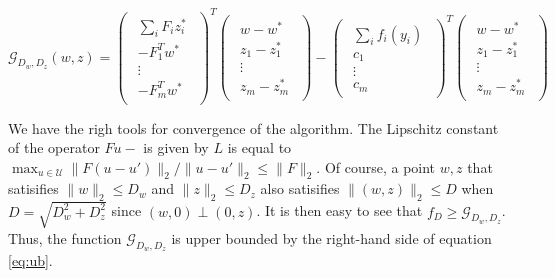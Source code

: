 \begin{equation*}
    \mathcal{G}_{D_{ w},D_{ z}}( w,  z)
    =
    \begin{pmatrix}
      \begin{array}{c}
        \sum_i  F_i  z_i^*\\
	- F_1^T  w^*\\
	\vdots\\
	- F_m^T  w^*
      \end{array}
    \end{pmatrix}^T
    \begin{pmatrix}
      \begin{array}{c}
	 w -  w^*\\
	 z_1 -  z_1^*\\
	\vdots\\
	 z_m -  z_m^*
      \end{array}
    \end{pmatrix} -
    \begin{pmatrix}
      \begin{array}{c}
	\sum_i  f_i( y_i)\\
	 c_1\\
	\vdots\\
	 c_m
      \end{array}
    \end{pmatrix}^T
    \begin{pmatrix}
      \begin{array}{c}
	 w -  w^*\\
	 z_1 -  z_1^*\\
	\vdots\\
	 z_m -  z_m^*
      \end{array}
    \end{pmatrix}
\end{equation*}

We have the righ tools for convergence of the algorithm. The Lipschitz constant 
of the operator $F  u - $ is given by $L$ is equal to $\max_{
u \in \mathcal{U}} \lVert  F ( u -  u') \rVert_2 / \lVert  u -
 u' \rVert_2 \leq \lVert  F \rVert_2$. Of course, a point $ w, 
z$ that satisifies $\lVert  w \rVert_2 \leq D_{ w}$ and $\lVert  z
\rVert_2 \leq D_{ z}$ also satisifies $\lVert ( w,  z) \rVert_2 \leq
D$ when $D = \sqrt{D_{ w}^2 + D_{ z}^2}$ since $( w, 0) \perp (0,
 z)$. It is then easy to see that $f_D \geq \mathcal{G}_{D_{ w}, D_{
z}}$. Thus, the function $\mathcal{G}_{D_{ w}, D_{ z}}$ is upper bounded
by the right-hand side of equation \ref{eq:ub}.

